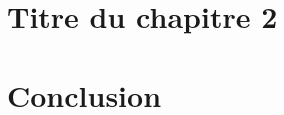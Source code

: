 \documentclass[a4paper, oneside, 12pt, final]{extreport}
\begin{document}
\chapter{Titre du chapitre 2}
\label{chap:2}



\chapter*{Conclusion}
\label{chap:conclusion}


\newpage
\renewcommand{\thepage}{\Alph{page}}

% 





\printglossary[type=\acronymtype, title={Liste des acronymes}]


\appendix




\nocite{*}


\cleardoublepage

\end{document}
